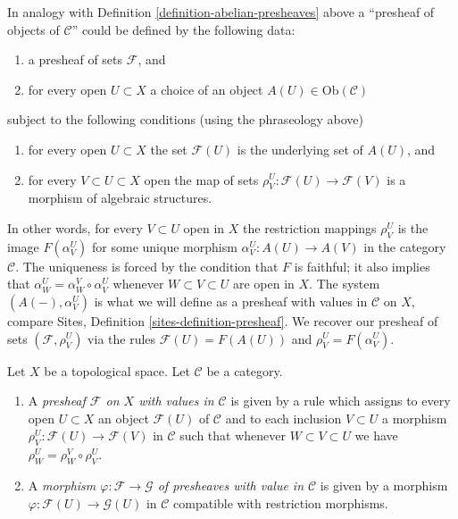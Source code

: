 \medskip\noindent
In analogy with Definition \ref{definition-abelian-presheaves}
above a ``presheaf of objects of $\mathcal{C}$'' could be
defined by the following data:
\begin{enumerate}
\item a presheaf of sets $\mathcal{F}$, and
\item for every open $U \subset X$ a choice
of an object $A(U) \in \text{Ob}(\mathcal{C})$
\end{enumerate}
subject to the following conditions (using the phraseology above)
\begin{enumerate}
\item for every open $U \subset X$ the set $\mathcal{F}(U)$
is the underlying set of $A(U)$, and
\item for every $V \subset U \subset X$ open
the map of sets $\rho_V^U: \mathcal{F}(U) \to \mathcal{F}(V)$
is a morphism of algebraic structures.
\end{enumerate}
In other words, for every $V \subset U$ open in $X$ 
the restriction mappings $\rho^U_V$ is the image
$F(\alpha^U_V)$ for some unique morphism
$\alpha^U_V : A(U) \to A(V)$ in the category $\mathcal{C}$.
The uniqueness is forced by the condition that $F$ is
faithful; it also implies that
$\alpha^U_W = \alpha^V_W \circ \alpha^U_V$
whenever $W \subset V \subset U$ are open in $X$.
The system $(A(-), \alpha^U_V)$ is what we will define as a
presheaf with values in $\mathcal{C}$ on $X$, compare
Sites, Definition \ref{sites-definition-presheaf}.
We recover our presheaf of sets $(\mathcal{F}, \rho_V^U)$
via the rules $\mathcal{F}(U) = F(A(U))$ and
$\rho_V^U = F(\alpha_V^U)$.

\begin{definition}
\label{definition-prefsheaf-values-in-category}
Let $X$ be a topological space.
Let $\mathcal{C}$ be a category.
\begin{enumerate}
\item A {\it presheaf $\mathcal{F}$ on $X$ with values in $\mathcal{C}$}
is given by a rule which assigns to every open $U \subset X$
an object $\mathcal{F}(U)$ of $\mathcal{C}$
and to each inclusion $V \subset U$
a morphism $\rho_V^U : \mathcal{F}(U) \to \mathcal{F}(V)$
in $\mathcal{C}$ such that whenever $W \subset V \subset U$
we have $\rho_W^U = \rho_W^V \circ \rho_V^U$.
\item A {\it morphism $\varphi : \mathcal{F} \to \mathcal{G}$
of presheaves with value in $\mathcal{C}$} is given by a
morphism $\varphi : \mathcal{F}(U) \to \mathcal{G}(U)$
in $\mathcal{C}$ compatible with restriction morphisms.
\end{enumerate}
\end{definition}

